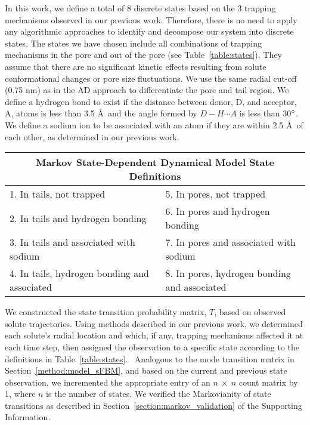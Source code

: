 \documentclass[journal=ancac3,manuscript=article,layout=twocolumn]{achemso}
\begin{document}
  In this work, we define a total of 8 discrete states based on the 3 trapping
  mechanisms observed in our previous work. Therefore, there is no need to
  apply any algorithmic approaches to identify and decompose our system into
  discrete states. The states we have chosen include all combinations of
  trapping mechanisms in the pore and out of the pore (see
  Table~\ref{table:states}). They assume that there are no significant kinetic
  effects resulting from solute conformational changes or pore size
  fluctuations. We use the same radial cut-off (0.75 nm) as in the AD approach to
  differentiate the pore and tail region. We define a hydrogen bond to exist
  if the distance between donor, D, and acceptor, A, atoms is less than 3.5
  \AA~and the angle formed by $D-H \cdots A$ is less than
  30$\degree$.~\cite{luzar_effect_1996} We define a sodium ion to be associated
  with an atom if they are within 2.5 \AA~of each other, as determined in our
  previous work.~\cite{coscia_chemically_2019}
  
  \begin{table*}[!htb]
	  \centering
	  \begin{tabular}{ll}
            \hline
            \hline
	  \multicolumn{2}{c}{Markov State-Dependent Dynamical Model State Definitions} \\
	  \hline
	  1. In tails, not trapped                      & 5. In pores, not trapped                     \\
	  2. In tails and hydrogen bonding              & 6. In pores and hydrogen bonding             \\
	  3. In tails and associated with sodium        & 7. In pores and associated with sodium       \\
	  4. In tails, hydrogen bonding and associated  ~~~~& 8. In pores, hydrogen bonding and associated \\
	  \hline
          \hline
	  \end{tabular}
	  \caption{We defined 8 discrete states based on all combinations of previously observed solute
	  trapping mechanisms.}\label{table:states}  
  \end{table*}
  
  We constructed the state transition probability matrix, $T$, based on
  observed solute trajectories. Using methods described in our previous work,
  we determined each solute's radial location and which, if any, trapping
  mechanisms affected it at each time step, then assigned the observation to a
  specific state according to the definitions in
  Table~\ref{table:states}.~\cite{coscia_chemically_2019} Analogous to the mode
  transition matrix in Section~\ref{method:model_sFBM}, and based on the
  current and previous state observation, we incremented the appropriate entry
  of an $n~\times~n$ count matrix by 1, where $n$ is the number of states. We
  verified the Markovianity of state transitions as described in
  Section~\ref{section:markov_validation} of the Supporting Information.
  
\end{document}
